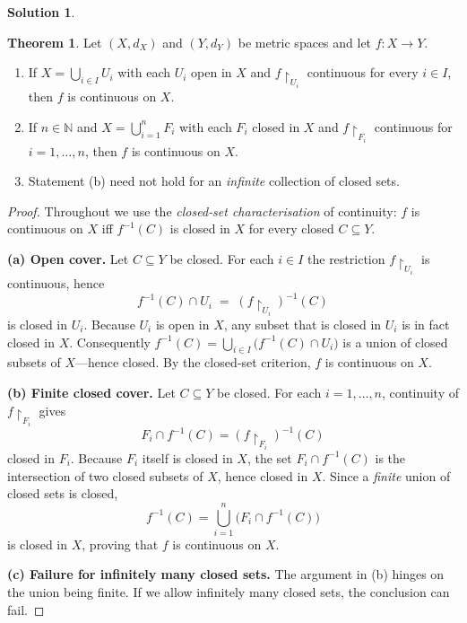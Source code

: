 \documentclass[12pt]{article}
\theoremstyle{definition} %
\newtheorem{solution}{Solution}
\newtheorem{theorem}{Theorem}
\theoremstyle{plain} %
\begin{document}
\begin{solution}
  \begin{theorem}
    Let $(X,d_X)$ and $(Y,d_Y)$ be metric spaces and let $f:X\to Y$.
    \begin{enumerate}[]
        \item If $X=\displaystyle\bigcup_{i\in I}U_i$ with each $U_i$ open in $X$ and
              $f\!\restriction_{U_i}$ continuous for every $i\in I$, then $f$ is continuous on $X$.
        \item If $n\in\mathbb{N}$ and $X=\displaystyle\bigcup_{i=1}^{n}F_i$ with each
              $F_i$ closed in $X$ and $f\!\restriction_{F_i}$ continuous for $i=1,\dots,n$,
              then $f$ is continuous on $X$.
        \item Statement \textup{(b)} need not hold for an \emph{infinite} collection of closed sets.
    \end{enumerate}
    \end{theorem}
    
    \begin{proof}
    Throughout we use the \emph{closed‐set characterisation} of continuity:  
    $f$ is continuous on $X$ iff $f^{-1}(C)$ is closed in $X$ for every closed $C\subseteq Y$.
    
    \smallskip
    \noindent\textbf{(a) Open cover.}
    Let $C\subseteq Y$ be closed.  
    For each $i\in I$ the restriction $f\!\restriction_{U_i}$ is continuous, hence
    \[
    f^{-1}(C)\cap U_i
       \;=\;(f\!\restriction_{U_i})^{-1}(C)
    \]
    is closed in $U_i$.  
    Because $U_i$ is open in $X$, any subset that is closed in $U_i$ is in fact closed in $X$.  
    Consequently $f^{-1}(C)=\bigcup_{i\in I}\bigl(f^{-1}(C)\cap U_i\bigr)$ is a union of closed
    subsets of $X$—hence closed.  By the closed‐set criterion, $f$ is continuous on $X$.
    
    \smallskip
    \noindent\textbf{(b) Finite closed cover.}
    Let $C\subseteq Y$ be closed.  For each $i=1,\dots,n$,
    continuity of $f\!\restriction_{F_i}$ gives
    \[
    F_i\cap f^{-1}(C)=(f\!\restriction_{F_i})^{-1}(C)
    \]
    closed in $F_i$.  
    Because $F_i$ itself is closed in $X$, the set $F_i\cap f^{-1}(C)$ is the intersection of two closed subsets of $X$, hence closed in $X$.  
    Since a \emph{finite} union of closed sets is closed, 
    \[
    f^{-1}(C)=\bigcup_{i=1}^{n}\bigl(F_i\cap f^{-1}(C)\bigr)
    \]
    is closed in $X$, proving that $f$ is continuous on $X$.
    
    \smallskip
    \noindent\textbf{(c) Failure for infinitely many closed sets.}
    The argument in (b) hinges on the union being finite.
    If we allow infinitely many closed sets, the conclusion can fail.
    

\end{proof}
\end{solution}
\end{document}
